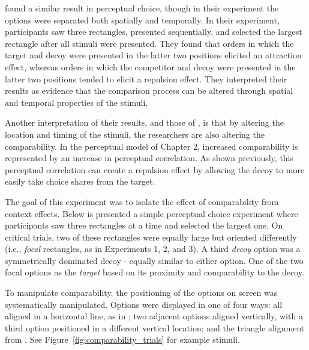 \textcite{evansImpactPresentationOrder2021} found a similar result in perceptual choice, though in their experiment the options were separated both spatially and temporally. In their experiment, participants saw three rectangles, presented sequentially, and selected the largest rectangle after all stimuli were presented. They found that orders in which the target and decoy were presented in the latter two positions elicited an attraction effect, whereas orders in which the competitor and decoy were presented in the latter two positions tended to elicit a repulsion effect. They interpreted their results as evidence that the comparison process can be altered through spatial and temporal properties of the stimuli.

Another interpretation of their results, and those of \textcite{trueblood2022attentional}, is that by altering the location and timing of the stimuli, the researchers are also altering the comparability. In the perceptual model of Chapter 2, increased comparability is represented by an increase in perceptual correlation. As shown previously, this perceptual correlation can create a repulsion effect by allowing the decoy to more easily take choice shares from the target.

The goal of this experiment was to isolate the effect of comparability from context effects. Below is presented a simple perceptual choice experiment where participants saw three rectangles at a time and selected the largest one. On critical trials, two of these rectangles were equally large but oriented differently (i.e., \textit{focal} rectangles, as in Experiments 1, 2, and 3). A third \textit{decoy} option was a symmetrically dominated decoy - equally similar to either option. One of the two focal options as the \textit{target} based on its proximity and comparability to the decoy. 

To manipulate comparability, the positioning of the options on screen was systematically manipulated. Options were displayed in one of four ways: all aligned in a horizontal line, as in \textcite{trueblood2013not}; two adjacent options aligned vertically, with a third option positioned in a different vertical location; and the triangle alignment from \textcite{spektorWhenGoodLooks2018b}. See Figure~\ref{fig:comparability_trials} for example stimuli.

